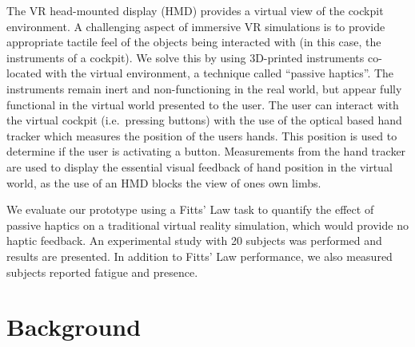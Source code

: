 \documentclass[]{aiaa-tc}%
\begin{document}
The VR head-mounted display (HMD) provides a virtual view of the cockpit environment.
A challenging aspect of immersive VR simulations is to provide appropriate tactile feel of the objects being interacted with (in this case, the instruments of a cockpit).
We solve this by using 3D-printed instruments co-located with the virtual environment, a technique called ``passive haptics''.
The instruments remain inert and non-functioning in the real world, but appear fully functional in the virtual world presented to the user.
The user can interact with the virtual cockpit (i.e.\ pressing buttons) with the use of the optical based hand tracker which measures the position of the users hands.
This position is used to determine if the user is activating a button.
Measurements from the hand tracker are used to display the essential visual feedback of hand position in the virtual world, as the use of an HMD blocks the view of ones own limbs.

We evaluate our prototype using a Fitts' Law task to quantify the effect of passive haptics on a traditional virtual reality simulation, which would provide no haptic feedback.
An experimental study with 20 subjects was performed and results are presented.
In addition to Fitts' Law performance, we also measured subjects reported fatigue and presence.

\section{Background}
\end{document}
